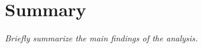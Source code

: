 \section{Summary}\label{sec:summary}

\noindent \textit{Briefly summarize the main findings of the analysis.}

